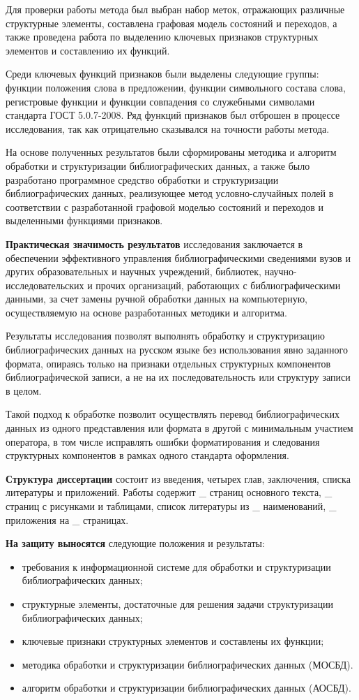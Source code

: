 Для проверки работы метода был выбран набор меток, отражающих различные структурные элементы, составлена графовая модель состояний и переходов, а также проведена работа по выделению ключевых признаков структурных элементов и составлению их функций.

Среди ключевых функций признаков были выделены следующие группы: функции положения слова в предложении, функции символьного состава слова, регистровые функции и функции совпадения со служебными символами стандарта ГОСТ 5.0.7-2008. Ряд функций признаков был отброшен в процессе исследования, так как отрицательно сказывался на точности работы метода.

На основе полученных результатов были сформированы методика и алгоритм обработки и структуризации библиографических данных, а также было разработано программное средство обработки и структуризации библиографических данных, реализующее метод условно-случайных полей в соответствии с разработанной графовой моделью состояний и переходов и выделенными функциями признаков.

\textbf{Практическая значимость результатов} исследования заключается в обеспечении эффективного управления библиографическими сведениями вузов и других образовательных и научных учреждений, библиотек, научно-исследовательских и прочих организаций, работающих с библиографическими данными, за счет замены ручной обработки данных на компьютерную, осуществляемую на основе разработанных методики и алгоритма.

Результаты исследования позволят выполнять обработку и структуризацию библиографических данных на русском языке без использования явно заданного формата, опираясь только на признаки отдельных структурных компонентов библиографической записи, а не на их последовательность или структуру записи в целом.

Такой подход к обработке позволит осуществлять перевод библиографических данных из одного представления или формата в другой с минимальным участием оператора, в том числе исправлять ошибки форматирования и следования структурных компонентов в рамках одного стандарта оформления.

\textbf{Структура диссертации} состоит из введения, четырех глав, заключения, списка литературы и приложений. Работы содержит \_ страниц основного текста, \_ страниц с рисунками и таблицами, список литературы из \_ наименований, \_ приложения на \_ страницах.

\textbf{На защиту выносятся} следующие положения и результаты:
\begin{itemize}
	\item требования к информационной системе для обработки и структуризации библиографических данных;
	\item структурные элементы, достаточные для решения задачи структуризации библиографических данных;
	\item ключевые признаки структурных элементов и составлены их функции;
	\item методика обработки и структуризации библиографических данных (МОСБД).
	\item алгоритм обработки и структуризации библиографических данных (АОСБД).
\end{itemize}
